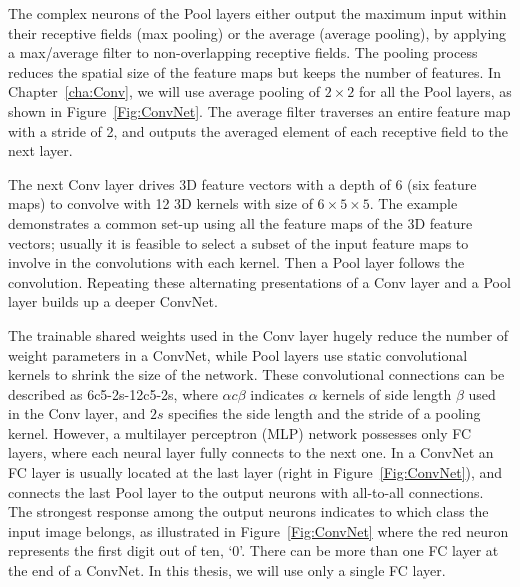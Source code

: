 The complex neurons of the Pool layers either output the maximum input within their receptive fields (max pooling) or the average (average pooling), by applying a max/average filter to non-overlapping receptive fields.
The pooling process reduces the spatial size of the feature maps but keeps the number of features.
In Chapter~\ref{cha:Conv}, we will use average pooling of $2\times2$ for all the Pool layers, as shown in Figure~\ref{Fig:ConvNet}.
The average filter traverses an entire feature map with a stride of 2, and outputs the averaged element of each receptive field to the next layer.

The next Conv layer drives 3D feature vectors with a depth of 6 (six feature maps) to convolve with 12 3D kernels with size of $6\times5\times5$.
The example demonstrates a common set-up using all the feature maps of the 3D feature vectors; usually it is feasible to select a subset of the input feature maps to involve in the convolutions with each kernel.
Then a Pool layer follows the convolution.
Repeating these alternating presentations of a Conv layer and a Pool layer builds up a deeper ConvNet.

The trainable shared weights used in the Conv layer hugely reduce the number of weight parameters in a ConvNet, while Pool layers use static convolutional kernels to shrink the size of the network.
These convolutional connections can be described as 6c5-2s-12c5-2s, where $\alpha c \beta$ indicates $\alpha$ kernels of side length $\beta$ used in the Conv layer, and $2s$ specifies the side length and the stride of a pooling kernel.
However, a multilayer perceptron (MLP) network possesses only FC layers, where each neural layer fully connects to the next one.
In a ConvNet an FC layer is usually located at the last layer (right in Figure~\ref{Fig:ConvNet}), and connects the last Pool layer to the output neurons with all-to-all connections.
The strongest response among the output neurons indicates to which class the input image belongs, as illustrated in Figure~\ref{Fig:ConvNet} where the red neuron represents the first digit out of ten, `0'.
There can be more than one FC layer at the end of a ConvNet.
In this thesis, we will use only a single FC layer.



